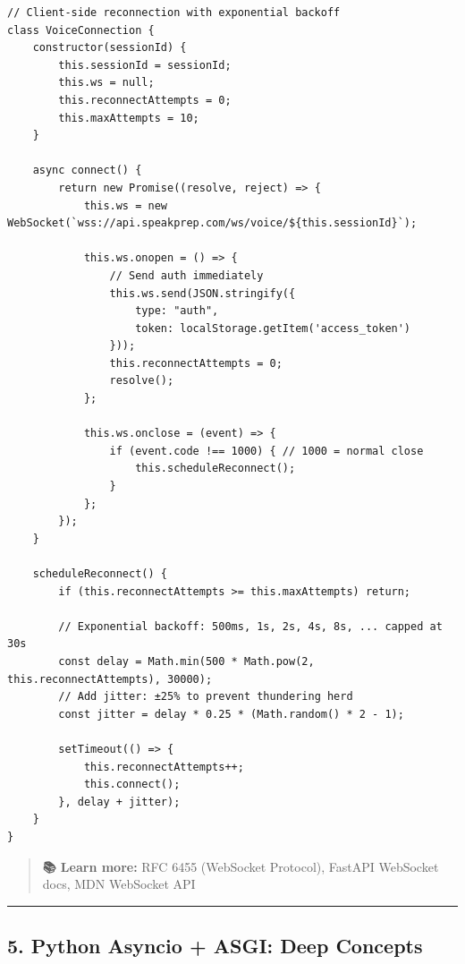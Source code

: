 \documentclass[
  11pt,
]{article}
\begin{document}
\begin{lstlisting}
// Client-side reconnection with exponential backoff
class VoiceConnection {
    constructor(sessionId) {
        this.sessionId = sessionId;
        this.ws = null;
        this.reconnectAttempts = 0;
        this.maxAttempts = 10;
    }
    
    async connect() {
        return new Promise((resolve, reject) => {
            this.ws = new WebSocket(`wss://api.speakprep.com/ws/voice/${this.sessionId}`);
            
            this.ws.onopen = () => {
                // Send auth immediately
                this.ws.send(JSON.stringify({
                    type: "auth",
                    token: localStorage.getItem('access_token')
                }));
                this.reconnectAttempts = 0;
                resolve();
            };
            
            this.ws.onclose = (event) => {
                if (event.code !== 1000) { // 1000 = normal close
                    this.scheduleReconnect();
                }
            };
        });
    }
    
    scheduleReconnect() {
        if (this.reconnectAttempts >= this.maxAttempts) return;
        
        // Exponential backoff: 500ms, 1s, 2s, 4s, 8s, ... capped at 30s
        const delay = Math.min(500 * Math.pow(2, this.reconnectAttempts), 30000);
        // Add jitter: ±25% to prevent thundering herd
        const jitter = delay * 0.25 * (Math.random() * 2 - 1);
        
        setTimeout(() => {
            this.reconnectAttempts++;
            this.connect();
        }, delay + jitter);
    }
}
\end{lstlisting}

\begin{quote}
\textbf{📚 Learn more:} RFC 6455 (WebSocket Protocol), FastAPI WebSocket
docs, MDN WebSocket API
\end{quote}

\begin{center}\rule{0.5\linewidth}{0.5pt}\end{center}

\hypertarget{python-asyncio-asgi-deep-concepts}{%
\subsection{5. Python Asyncio + ASGI: Deep
Concepts}\label{python-asyncio-asgi-deep-concepts}}
\end{document}

